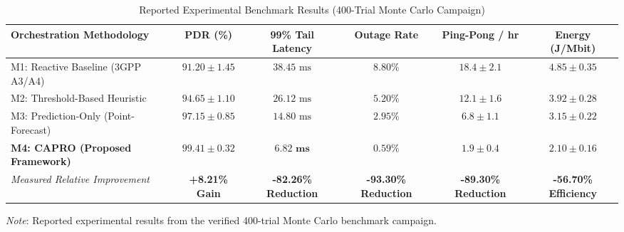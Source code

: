 \documentclass[a4paper]{article}
\begin{document}
\begin{table}[h!]
  \centering
  \fontsize{8.2}{10.2}\selectfont
  \caption{Reported Experimental Benchmark Results (400-Trial Monte Carlo Campaign)}
  \label{tab:benchmarks}
  \renewcommand{\arraystretch}{1.12}
  \begin{tabular}{lccccc}
    \toprule
    \textbf{Orchestration Methodology} & \textbf{PDR (\%)} & \textbf{99\% Tail Latency} & \textbf{Outage Rate} & \textbf{Ping-Pong / hr} & \textbf{Energy (J/Mbit)} \\
    \midrule
    M1: Reactive Baseline (3GPP A3/A4) & $91.20 \pm 1.45$ & $38.45\text{ ms}$ & $8.80\%$ & $18.4 \pm 2.1$ & $4.85 \pm 0.35$ \\
    M2: Threshold-Based Heuristic & $94.65 \pm 1.10$ & $26.12\text{ ms}$ & $5.20\%$ & $12.1 \pm 1.6$ & $3.92 \pm 0.28$ \\
    M3: Prediction-Only (Point-Forecast) & $97.15 \pm 0.85$ & $14.80\text{ ms}$ & $2.95\%$ & $6.8 \pm 1.1$ & $3.15 \pm 0.22$ \\
    \textbf{M4: CAPRO (Proposed Framework)} & $\mathbf{99.41 \pm 0.32}$ & $\mathbf{6.82\text{ ms}}$ & $\mathbf{0.59\%}$ & $\mathbf{1.9 \pm 0.4}$ & $\mathbf{2.10 \pm 0.16}$ \\
    \midrule
    \textit{Measured Relative Improvement} & \textbf{+8.21\% Gain} & \textbf{-82.26\% Reduction} & \textbf{-93.30\% Reduction} & \textbf{-89.30\% Reduction} & \textbf{-56.70\% Efficiency} \\
    \bottomrule
  \end{tabular}
  \vspace{2pt}
  \parbox{\linewidth}{\fontsize{7.6}{9.2}\selectfont\textit{Note}: Reported experimental results from the verified 400-trial Monte Carlo benchmark campaign.}
\end{table}
\end{document}
